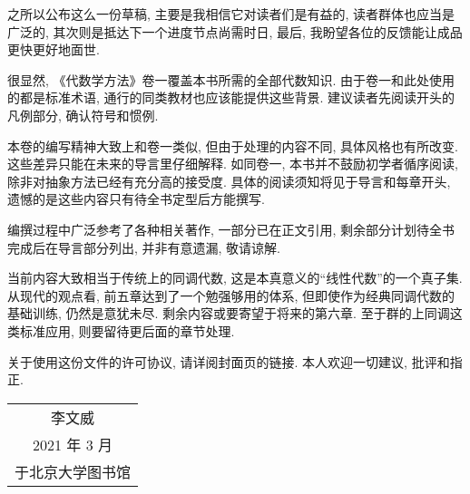 之所以公布这么一份草稿, 主要是我相信它对读者们是有益的, 读者群体也应当是广泛的, 其次则是抵达下一个进度节点尚需时日, 最后, 我盼望各位的反馈能让成品更快更好地面世.

很显然, 《代数学方法》卷一覆盖本书所需的全部代数知识. 由于卷一和此处使用的都是标准术语, 通行的同类教材也应该能提供这些背景. 建议读者先阅读开头的凡例部分, 确认符号和惯例.

本卷的编写精神大致上和卷一类似, 但由于处理的内容不同, 具体风格也有所改变. 这些差异只能在未来的导言里仔细解释. 如同卷一, 本书并不鼓励初学者循序阅读, 除非对抽象方法已经有充分高的接受度. 具体的阅读须知将见于导言和每章开头, 遗憾的是这些内容只有待全书定型后方能撰写.

编撰过程中广泛参考了各种相关著作, 一部分已在正文引用, 剩余部分计划待全书完成后在导言部分列出, 并非有意遗漏, 敬请谅解.

当前内容大致相当于传统上的同调代数, 这是本真意义的``线性代数''的一个真子集. 从现代的观点看, 前五章达到了一个勉强够用的体系, 但即使作为经典同调代数的基础训练, 仍然是意犹未尽. 剩余内容或要寄望于将来的第六章. 至于群的上同调这类标准应用, 则要留待更后面的章节处理.

关于使用这份文件的许可协议, 请详阅封面页的链接. 本人欢迎一切建议, 批评和指正.

\vspace{1em}
\begin{flushright}\begin{minipage}{0.3 \textwidth}
		\begin{tabular}{c}
			{\fangsong 李文威} \\
			2021 年 3 月 \\
			于北京大学图书馆
		\end{tabular}
\end{minipage}\end{flushright}